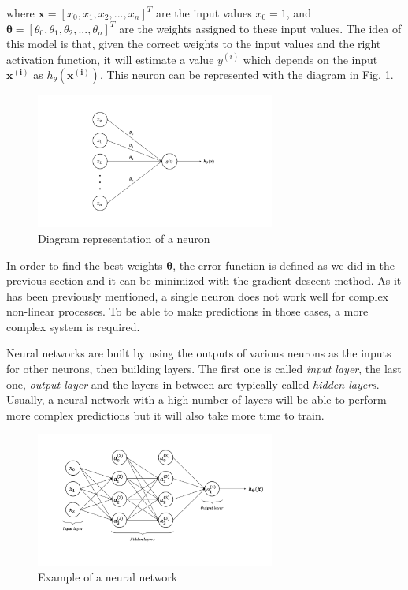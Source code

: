 \documentclass[a4paper, report, oneside, UKenglish]{memoir}
\newcommand{\x}{\boldsymbol{x}}
\newcommand{\btheta}{\boldsymbol{\theta}}
\begin{document}
where $\x = [x_0, x_1, x_2, ..., x_n]^T$ are the input values $x_0 = 1$, and $\btheta = [\theta_0, \theta_1, \theta_2, ..., \theta_n]^T$ are the weights assigned to these input values. The idea of this model is that, given the correct weights to the input values and the right activation function, it will estimate a value $y^{(i)}$ which depends on the input $\boldsymbol{x^{(i)}}$ as $h_\theta(\boldsymbol{x^{(i)}})$. This neuron can be represented with the diagram in Fig. \ref{fig:neuron_diag}. 

\begin{figure}[hbt]
    \centering
    \includegraphics[width=0.7\textwidth]{figures/fitting/neuron_diagram.png}
    \caption{Diagram representation of a neuron}
    \label{fig:neuron_diag}
\end{figure}

In order to find the best weights $\btheta$, the error function is defined as we did in the previous section and it can be minimized with the gradient descent method. As it has been previously mentioned, a single neuron does not work well for complex non-linear processes. To be able to make predictions in those cases, a more complex system is required. 

Neural networks are built by using the outputs of various neurons as the inputs for other neurons, then building layers. The first one is called \textit{input layer}, the last one, \textit{output layer} and the layers in between are typically called \textit{hidden layers}. Usually, a neural network with a high number of layers will be able to perform more complex predictions but it will also take more time to train.

\begin{figure}[ht]
    \centering
    \includegraphics[width=0.7\textwidth]{figures/fitting/neural_network_example.png}
    \caption{Example of a neural network}
    \label{fig:neural_network_example}
\end{figure}
\end{document}
